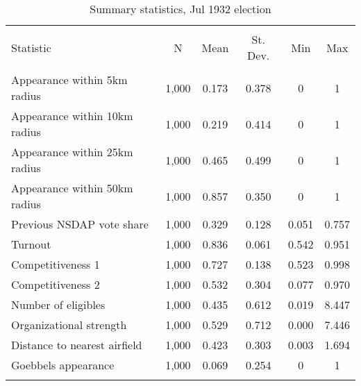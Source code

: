 
\begin{table}[!htbp] \centering 
  \caption{Summary statistics, Jul 1932 election} 
  \label{tab:sumstats1932r1} 
\begin{tabular}{@{\extracolsep{5pt}}lccccc} 
\\[-1.8ex]\hline \\[-1.8ex] 
Statistic & \multicolumn{1}{c}{N} & \multicolumn{1}{c}{Mean} & \multicolumn{1}{c}{St. Dev.} & \multicolumn{1}{c}{Min} & \multicolumn{1}{c}{Max} \\ 
\hline \\[-1.8ex] 
Appearance within 5km radius & 1,000 & 0.173 & 0.378 & 0 & 1 \\ 
Appearance within 10km radius & 1,000 & 0.219 & 0.414 & 0 & 1 \\ 
Appearance within 25km radius & 1,000 & 0.465 & 0.499 & 0 & 1 \\ 
Appearance within 50km radius & 1,000 & 0.857 & 0.350 & 0 & 1 \\ 
Previous NSDAP vote share & 1,000 & 0.329 & 0.128 & 0.051 & 0.757 \\ 
Turnout & 1,000 & 0.836 & 0.061 & 0.542 & 0.951 \\ 
Competitiveness 1 & 1,000 & 0.727 & 0.138 & 0.523 & 0.998 \\ 
Competitiveness 2 & 1,000 & 0.532 & 0.304 & 0.077 & 0.970 \\ 
Number of eligibles & 1,000 & 0.435 & 0.612 & 0.019 & 8.447 \\ 
Organizational strength & 1,000 & 0.529 & 0.712 & 0.000 & 7.446 \\ 
Distance to nearest airfield & 1,000 & 0.423 & 0.303 & 0.003 & 1.694 \\ 
Goebbels appearance & 1,000 & 0.069 & 0.254 & 0 & 1 \\ 
\hline \\[-1.8ex] 
\end{tabular} 
\end{table} 
